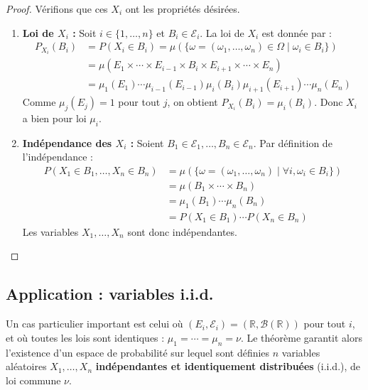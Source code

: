 \begin{proof}
Vérifions que ces $X_i$ ont les propriétés désirées.
\begin{enumerate}
    \item \textbf{Loi de $X_i$ :} Soit $i \in \{1, \ldots, n\}$ et $B_i \in \mathcal{E}_i$. La loi de $X_i$ est donnée par :
    \begin{align*}
    P_{X_i}(B_i) &= P(X_i \in B_i) = \mu(\{\omega = (\omega_1, \ldots, \omega_n) \in \Omega \mid \omega_i \in B_i\}) \\
    &= \mu(E_1 \times \cdots \times E_{i-1} \times B_i \times E_{i+1} \times \cdots \times E_n) \\
    &= \mu_1(E_1) \cdots \mu_{i-1}(E_{i-1}) \mu_i(B_i) \mu_{i+1}(E_{i+1}) \cdots \mu_n(E_n)
    \end{align*}
    Comme $\mu_j(E_j)=1$ pour tout $j$, on obtient $P_{X_i}(B_i) = \mu_i(B_i)$. Donc $X_i$ a bien pour loi $\mu_i$.
    \item \textbf{Indépendance des $X_i$ :} Soient $B_1 \in \mathcal{E}_1, \ldots, B_n \in \mathcal{E}_n$. Par définition de l'indépendance :
    \begin{align*}
    P(X_1 \in B_1, \ldots, X_n \in B_n) &= \mu(\{\omega = (\omega_1, \ldots, \omega_n) \mid \forall i, \omega_i \in B_i\}) \\
    &= \mu(B_1 \times \cdots \times B_n) \\
    &= \mu_1(B_1) \cdots \mu_n(B_n) \\
    &= P(X_1 \in B_1) \cdots P(X_n \in B_n)
    \end{align*}
    Les variables $X_1, \ldots, X_n$ sont donc indépendantes.
\end{enumerate}
\end{proof}
\subsection{Application : variables i.i.d.}
Un cas particulier important est celui où $(E_i, \mathcal{E}_i) = (\mathbb{R}, \mathcal{B}(\mathbb{R}))$ pour tout $i$, et où toutes les lois sont identiques : $\mu_1 = \cdots = \mu_n = \nu$. Le théorème garantit alors l'existence d'un espace de probabilité sur lequel sont définies $n$ variables aléatoires $X_1, \ldots, X_n$ \textbf{indépendantes et identiquement distribuées} (i.i.d.), de loi commune $\nu$.
